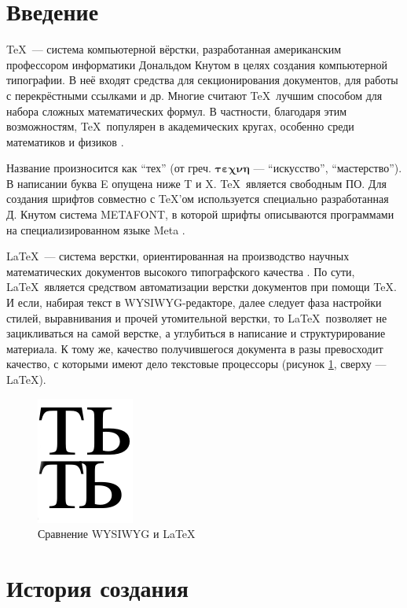 \section*{Введение}

\TeX~--- система компьютерной вёрстки, разработанная американским профессором информатики Дональдом Кнутом в целях создания компьютерной типографии.  В неё входят средства для секционирования документов, для работы с перекрёстными ссылками и др. Многие считают \TeX~лучшим способом для набора сложных математических формул. В частности, благодаря этим возможностям, \TeX~популярен в академических кругах, особенно среди математиков и физиков \cite{wiki:tex}.

Название произносится как ``тех'' (от греч. $\boldsymbol{\tau\varepsilon\chi\nu\eta}$ --- ``искусство'', ``мастерство''). В написании буква E опущена ниже T и X. \TeX~является свободным ПО. Для создания шрифтов совместно с \TeX’ом используется специально разработанная Д. Кнутом система METAFONT, в которой шрифты описываются программами на специализированном языке Meta \cite{wiki:tex}.

\LaTeX~--- система верстки, ориентированная на производство научных математических документов высокого типографского качества \cite{introlatex}. По сути, \LaTeX~является средством автоматизации верстки документов при помощи \TeX. И если, набирая текст в WYSIWYG-редакторе, далее следует фаза настройки стилей, выравнивания и прочей утомительной верстки, то \LaTeX~позволяет не зацикливаться на самой верстке, а углубиться в написание и структурирование материала. К тому же, качество получившегося документа в разы превосходит качество, с которыми имеют дело текстовые процессоры (рисунок \ref{fig:quality}, сверху --- \LaTeX).

\begin{figure}[ht]
    \includegraphics[width=.2\linewidth]{Figures/quality.png}
    \caption{Сравнение WYSIWYG и \LaTeX}
    \label{fig:quality}
\end{figure}

\section{История создания}

